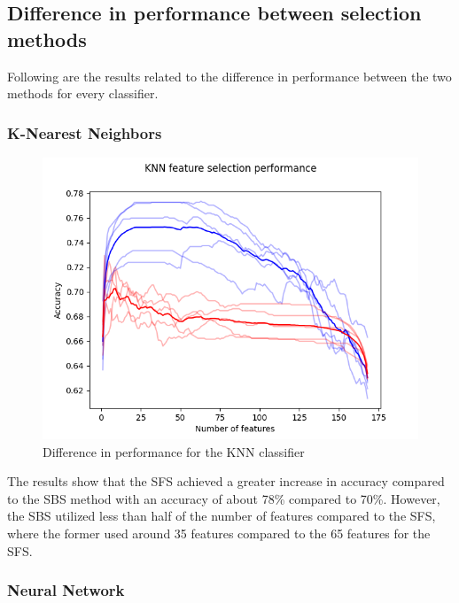 \documentclass{kththesis}
\begin{document}
\newpage

\subsection{Difference in performance between selection methods}

Following are the results related to the difference in performance between the two methods for every classifier.
\subsubsection{K-Nearest Neighbors}

\begin{figure}[h!]
  \begin{center}
    \includegraphics[scale=0.8]{../new_plots/knn_graph.png}
    \caption{Difference in performance for the KNN classifier}
  \end{center}
\end{figure}

The results show that the SFS achieved a greater increase in accuracy compared to the SBS method with an accuracy of about 78\% compared to 70\%. However, the SBS utilized less than half of the number of features compared to the SFS, where the former used around 35 features compared to the 65 features for the SFS.

\newpage

\subsubsection{Neural Network}
\end{document}
